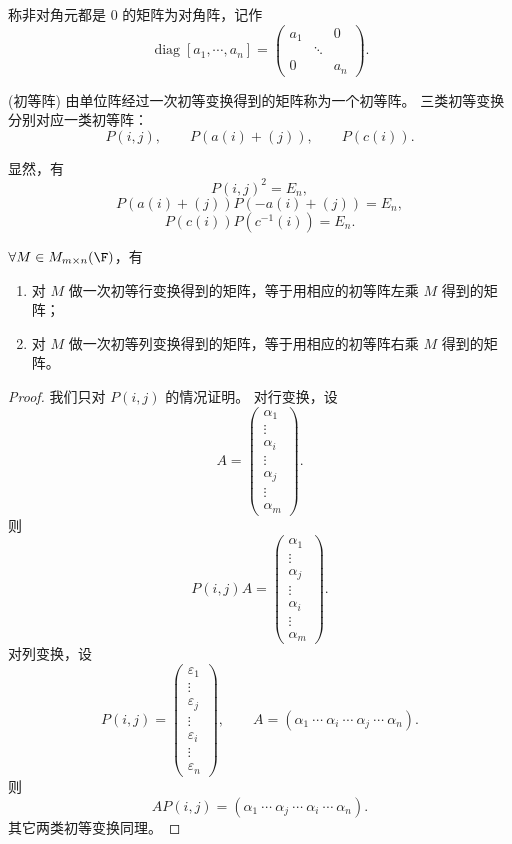 \begin{definition}
	称非对角元都是 $0$ 的矩阵为对角阵，记作
	\[
	\operatorname{diag}[a_1,\cdots,a_n]=
	\begin{pmatrix}
		a_1&&0\\
		&\ddots&\\
		0&&a_n
	\end{pmatrix}.
	\]
\end{definition}

\begin{definition}(初等阵)\label{3.3.11}
	由单位阵经过一次初等变换得到的矩阵称为一个初等阵。
	三类初等变换分别对应一类初等阵：
	\[
	P(i,j),\qquad P(a(i)+(j)),\qquad P(c(i)).
	\]

\end{definition}
	显然，有
\[
P(i,j)^2=E_n,
\]
\[
P(a(i)+(j))P(-a(i)+(j))=E_n,
\]
\[
P(c(i))P(c^{-1}(i))=E_n.
\]
\begin{theorem}
	$\forall M\in M_{m\times n}(\F)$，有
	\begin{enumerate}
		\item 对 $M$ 做一次初等行变换得到的矩阵，等于用相应的初等阵左乘 $M$ 得到的矩阵；
		\item 对 $M$ 做一次初等列变换得到的矩阵，等于用相应的初等阵右乘 $M$ 得到的矩阵。
	\end{enumerate}
\end{theorem}

\begin{proof}
	我们只对 $P(i,j)$ 的情况证明。
	对行变换，设
	\[
	A=
	\begin{pmatrix}
		\alpha_1\\
		\vdots\\
		\alpha_i\\
		\vdots\\
		\alpha_j\\
		\vdots\\
		\alpha_m
	\end{pmatrix}.
	\]
	则
	\[
	P(i,j)A=
	\begin{pmatrix}
		\alpha_1\\
		\vdots\\
		\alpha_j\\
		\vdots\\
		\alpha_i\\
		\vdots\\
		\alpha_m
	\end{pmatrix}.
	\]
	对列变换，设
	\[
	P(i,j)=
	\begin{pmatrix}
		\varepsilon_1\\
		\vdots\\
		\varepsilon_j\\
		\vdots\\
		\varepsilon_i\\
		\vdots\\
		\varepsilon_n
	\end{pmatrix},
	\qquad
	A=(\alpha_1\ \cdots\ \alpha_i\ \cdots\ \alpha_j\ \cdots\ \alpha_n).
	\]
	则
	\[
	AP(i,j)=(\alpha_1\ \cdots\ \alpha_j\ \cdots\ \alpha_i\ \cdots\ \alpha_n).
	\]
	其它两类初等变换同理。
\end{proof}

